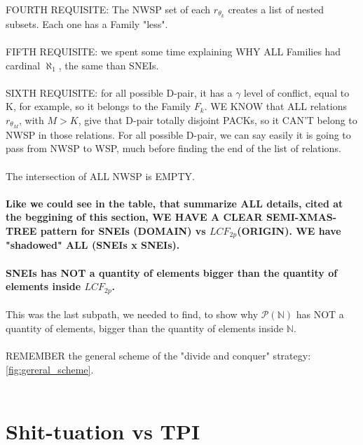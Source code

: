 		\noindent
		FOURTH REQUISITE: The NWSP set of each $r_{\theta_{k}}$ creates a list of nested subsets. Each one has a Family "less".
		\\\\
		
		\noindent
		FIFTH REQUISITE: we spent some time explaining WHY ALL Families had cardinal $\aleph_{1}$, the same than SNEIs.
		\\\\
		
		\noindent
		SIXTH REQUISITE: for all possible D-pair, it has a $\gamma$ level of conflict, equal to K, for example, so it belongs to the Family $F_{k}$. WE KNOW that ALL relations $r_{\theta_{M}}$, with $M > K$, give that D-pair totally disjoint PACKs, so it CAN'T belong to NWSP in those relations. For all possible D-pair, we can say easily it is going to pass from NWSP to WSP, much before finding the end of the list of relations.\\\\
		The intersection of ALL NWSP is EMPTY.
		\\\\
		
		\noindent
		\textbf{Like we could see in the table, that summarize ALL details, cited at the beggining of this section, WE HAVE A CLEAR SEMI-XMAS-TREE pattern for SNEIs (DOMAIN) vs $LCF_{2p}$(ORIGIN). WE have "shadowed" ALL (SNEIs x SNEIs).}
		\\\\
		
		\noindent
		\textbf{SNEIs has NOT a quantity of elements bigger than the quantity of elements inside $LCF_{2p}$.}
		\\\\
		
		\noindent
		This was the last subpath, we needed to find, to show why $\mathcal{P}(\mathbb{N})$ has NOT a quantity of elements, bigger than the quantity of elements inside $\mathbb{N}$.
		\\\\
		
		\noindent
		REMEMBER the general scheme of the "divide and conquer" strategy: \ref{fig:gereral_scheme}.
		\\\\
		
	\newpage
	\section{Shit-tuation vs TPI}
	
